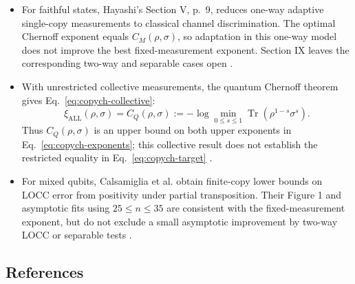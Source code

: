 \begin{itemize}
  \item For faithful states, Hayashi's Section V, p.~9, reduces one-way adaptive single-copy measurements to classical channel discrimination. The optimal Chernoff exponent equals $C_M(\rho,\sigma)$, so adaptation in this one-way model does not improve the best fixed-measurement exponent. Section IX leaves the corresponding two-way and separable cases open .

  \item With unrestricted collective measurements, the quantum Chernoff theorem gives Eq.~\eqref{eq:copych-collective}:
\begin{equation}
\xi_{\mathrm{ALL}}(\rho,\sigma)=C_Q(\rho,\sigma):=-\log\min_{0\leq s\leq1}\operatorname{Tr}(\rho^{1-s}\sigma^s).
\label{eq:copych-collective}
\end{equation}
Thus $C_Q(\rho,\sigma)$ is an upper bound on both upper exponents in Eq.~\eqref{eq:copych-exponents}; this collective result does not establish the restricted equality in Eq.~\eqref{eq:copych-target} .

  \item For mixed qubits, Calsamiglia et al. obtain finite-copy lower bounds on LOCC error from positivity under partial transposition. Their Figure 1 and asymptotic fits using $25\leq n\leq35$ are consistent with the fixed-measurement exponent, but do not exclude a small asymptotic improvement by two-way LOCC or separable tests .
\end{itemize}

\subsection*{References}

